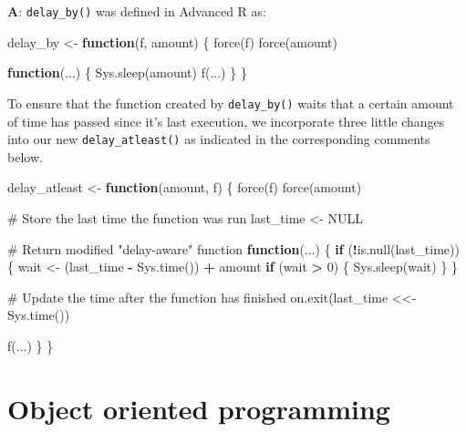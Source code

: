 \documentclass[
]{krantz}
\makeatletter
\newenvironment{Shaded}{\begin{snugshade}}{\end{snugshade}}
\newcommand{\CommentTok}[1]{\textcolor[rgb]{0.56,0.35,0.01}{\textit{#1}}}
\newcommand{\ControlFlowTok}[1]{\textcolor[rgb]{0.13,0.29,0.53}{\textbf{#1}}}
\newcommand{\DecValTok}[1]{\textcolor[rgb]{0.00,0.00,0.81}{#1}}
\newcommand{\KeywordTok}[1]{\textcolor[rgb]{0.13,0.29,0.53}{\textbf{#1}}}
\newcommand{\NormalTok}[1]{#1}
\newcommand{\OperatorTok}[1]{\textcolor[rgb]{0.81,0.36,0.00}{\textbf{#1}}}
\newcommand{\OtherTok}[1]{\textcolor[rgb]{0.56,0.35,0.01}{#1}}
\newcommand{\StringTok}[1]{\textcolor[rgb]{0.31,0.60,0.02}{#1}}
\newenvironment{kframe}{%
\medskip{}
\setlength{\fboxsep}{.8em}
 \def\at@end@of@kframe{}%
 \ifinner\ifhmode%
  \def\at@end@of@kframe{\end{minipage}}%
  \begin{minipage}{\columnwidth}%
 \fi\fi%
 \def\FrameCommand##1{\hskip\@totalleftmargin \hskip-\fboxsep
 \colorbox{shadecolor}{##1}\hskip-\fboxsep
     \hskip-\linewidth \hskip-\@totalleftmargin \hskip\columnwidth}%
 \MakeFramed {\advance\hsize-\width
   \@totalleftmargin\z@ \linewidth\hsize
   \@setminipage}}%
 {\par\unskip\endMakeFramed%
 \at@end@of@kframe}
\renewenvironment{Shaded}{\begin{kframe}}{\end{kframe}}
\renewcommand{\KeywordTok} [1]{\textcolor[rgb]{0.00,0.44,0.13}{{#1}}}
\renewcommand{\DecValTok}  [1]{\textcolor[rgb]{0.25,0.63,0.44}{{#1}}}
\renewcommand{\StringTok}  [1]{\textcolor[rgb]{0.25,0.44,0.63}{{#1}}}
\renewcommand{\CommentTok} [1]{\textcolor[rgb]{0.38,0.63,0.69}{{#1}}}
\renewcommand{\OtherTok}   [1]{\textcolor[rgb]{0.00,0.44,0.13}{{#1}}}
\renewcommand{\NormalTok}  [1]{{#1}}
\makeatother
\begin{document}
\textbf{{A}}: \texttt{delay\_by()} was defined in Advanced R as:

\begin{Shaded}
\begin{Highlighting}[]
\NormalTok{delay_by <-}\StringTok{ }\ControlFlowTok{function}\NormalTok{(f, amount) \{}
  \KeywordTok{force}\NormalTok{(f)}
  \KeywordTok{force}\NormalTok{(amount)}
  
  \ControlFlowTok{function}\NormalTok{(...) \{}
    \KeywordTok{Sys.sleep}\NormalTok{(amount)}
    \KeywordTok{f}\NormalTok{(...)}
\NormalTok{  \}}
\NormalTok{\}}
\end{Highlighting}
\end{Shaded}

To ensure that the function created by \texttt{delay\_by()} waits that a certain amount of time has passed since it's last execution, we incorporate three little changes into our new \texttt{delay\_atleast()} as indicated in the corresponding comments below.

\begin{Shaded}
\begin{Highlighting}[]
\NormalTok{delay_atleast <-}\StringTok{ }\ControlFlowTok{function}\NormalTok{(amount, f) \{}
  \KeywordTok{force}\NormalTok{(f)}
  \KeywordTok{force}\NormalTok{(amount)}
  
  \CommentTok{# Store the last time the function was run}
\NormalTok{  last_time <-}\StringTok{ }\OtherTok{NULL}
  
  \CommentTok{# Return modified "delay-aware" function}
  \ControlFlowTok{function}\NormalTok{(...) \{}
    \ControlFlowTok{if}\NormalTok{ (}\OperatorTok{!}\KeywordTok{is.null}\NormalTok{(last_time)) \{}
\NormalTok{      wait <-}\StringTok{ }\NormalTok{(last_time }\OperatorTok{-}\StringTok{ }\KeywordTok{Sys.time}\NormalTok{()) }\OperatorTok{+}\StringTok{ }\NormalTok{amount}
      \ControlFlowTok{if}\NormalTok{ (wait }\OperatorTok{>}\StringTok{ }\DecValTok{0}\NormalTok{) \{}
        \KeywordTok{Sys.sleep}\NormalTok{(wait)}
\NormalTok{      \}}
\NormalTok{    \}}
    
    \CommentTok{# Update the time after the function has finished}
    \KeywordTok{on.exit}\NormalTok{(last_time <<-}\StringTok{ }\KeywordTok{Sys.time}\NormalTok{()) }
    
    \KeywordTok{f}\NormalTok{(...)}
\NormalTok{  \}}
\NormalTok{\}}
\end{Highlighting}
\end{Shaded}

\hypertarget{part-object-oriented-programming}{%
\part{Object oriented programming}\label{part-object-oriented-programming}}
\end{document}

